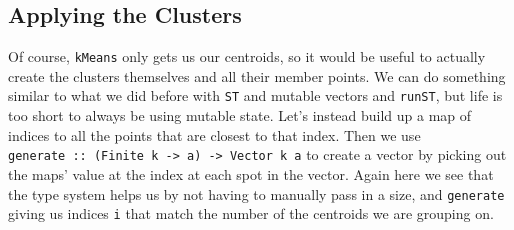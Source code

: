 \documentclass[]{article}
\newenvironment{Shaded}{}{}
\newcommand{\CommentTok}[1]{\textcolor[rgb]{0.38,0.63,0.69}{\textit{#1}}}
\newcommand{\DataTypeTok}[1]{\textcolor[rgb]{0.56,0.13,0.00}{#1}}
\newcommand{\DecValTok}[1]{\textcolor[rgb]{0.25,0.63,0.44}{#1}}
\newcommand{\KeywordTok}[1]{\textcolor[rgb]{0.00,0.44,0.13}{\textbf{#1}}}
\newcommand{\NormalTok}[1]{#1}
\newcommand{\OperatorTok}[1]{\textcolor[rgb]{0.40,0.40,0.40}{#1}}
\newcommand{\OtherTok}[1]{\textcolor[rgb]{0.00,0.44,0.13}{#1}}
\begin{document}
\begin{Shaded}
\end{Shaded}

\subsection{Applying the Clusters}\label{applying-the-clusters}

Of course, \texttt{kMeans} only gets us our centroids, so it would be useful to
actually create the clusters themselves and all their member points. We can do
something similar to what we did before with \texttt{ST} and mutable vectors and
\texttt{runST}, but life is too short to always be using mutable state. Let's
instead build up a map of indices to all the points that are closest to that
index. Then we use
\texttt{generate\ ::\ (Finite\ k\ -\textgreater{}\ a)\ -\textgreater{}\ Vector\ k\ a}
to create a vector by picking out the maps' value at the index at each spot in
the vector. Again here we see that the type system helps us by not having to
manually pass in a size, and \texttt{generate} giving us indices \texttt{i} that
match the number of the centroids we are grouping on.
\end{document}
